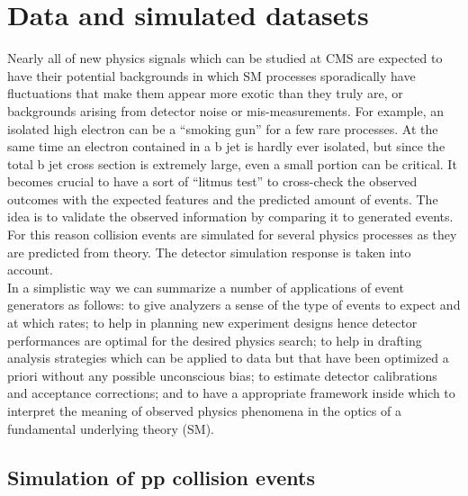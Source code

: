 \chapter{Data and simulated datasets} \label{Chapter4} 


Nearly all of new physics signals which can be studied at CMS are
expected to have their potential backgrounds in which SM
processes sporadically have fluctuations that make them appear more
exotic than they truly are, or backgrounds arising from detector noise
or mis-measurements.
For example, an isolated high \pt electron can be a ``smoking gun'' for
a few rare processes. At the same time an electron contained in a b
jet is hardly ever isolated, but since the total b jet cross section
is extremely large, even a small portion can be critical. It becomes
crucial to have a sort of ``litmus test'' to cross-check the observed
outcomes with the expected features and the predicted amount of events.
The idea is to validate the observed information by comparing it to
generated events. For this reason collision events are simulated for
several physics processes as they are predicted from theory. The
detector simulation response is taken into account. \\
In a simplistic way we can summarize a number of applications of event
generators as follows: to give analyzers a sense of the type of
events to expect and at which rates; to help in planning new
experiment designs hence detector performances are optimal for the
desired physics search; to help in drafting analysis strategies which
can be applied to data but that have been optimized a priori without
any possible unconscious bias; to estimate detector calibrations and acceptance
corrections; and to have a appropriate framework inside which to
interpret the meaning of observed physics phenomena in the optics of a
fundamental underlying theory (SM).



\section{Simulation of pp collision events}\label{sec:c4eventsimulation}

